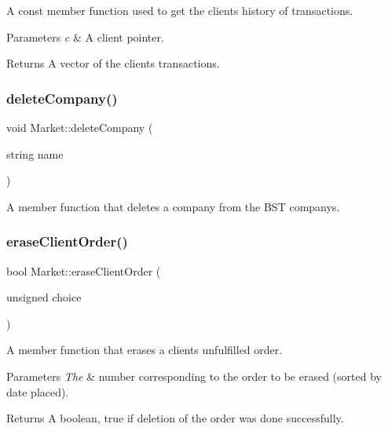A const member function used to get the client\textquotesingle{}s history of transactions. 
\begin{DoxyParams}{Parameters}
{\em c} & A client pointer. \\
\hline
\end{DoxyParams}
\begin{DoxyReturn}{Returns}
A vector of the client\textquotesingle{}s transactions. 
\end{DoxyReturn}
\mbox{\label{class_market_ac22c934965a47c17b68318c610a9d20f}} 
\subsubsection{\texorpdfstring{delete\+Company()}{deleteCompany()}}
{\footnotesize\ttfamily void Market\+::delete\+Company (\begin{DoxyParamCaption}\item[{string}]{name }\end{DoxyParamCaption})}

A member function that deletes a company from the B\+ST companys. \mbox{\label{class_market_a84df7da0cc63a1ff6d22e467e5060758}} 
\subsubsection{\texorpdfstring{erase\+Client\+Order()}{eraseClientOrder()}}
{\footnotesize\ttfamily bool Market\+::erase\+Client\+Order (\begin{DoxyParamCaption}\item[{unsigned}]{choice }\end{DoxyParamCaption})}

A member function that erases a client\textquotesingle{}s unfulfilled order. 
\begin{DoxyParams}{Parameters}
{\em The} & number corresponding to the order to be erased (sorted by date placed). \\
\hline
\end{DoxyParams}
\begin{DoxyReturn}{Returns}
A boolean, true if deletion of the order was done successfully. 
\end{DoxyReturn}
\mbox{\label{class_market_acc909b8410ea76b1dfecf92088264741}} 
